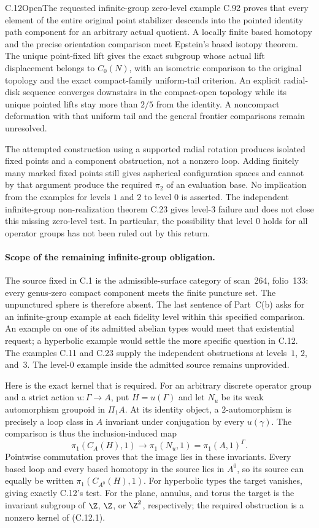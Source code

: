 \begin{claim}{C.12}{Open}{The requested infinite-group zero-level example}
C.92 proves that every element of the entire original point stabilizer descends into the pointed identity path component for an arbitrary actual quotient. A locally finite based homotopy and the precise orientation comparison meet Epstein's based isotopy theorem. The unique point-fixed lift gives the exact subgroup whose actual lift displacement belongs to $C_0(N)$, with an isometric comparison to the original topology and the exact compact-family uniform-tail criterion. An explicit radial-disk sequence converges downstairs in the compact-open topology while its unique pointed lifts stay more than $2/5$ from the identity. A noncompact deformation with that uniform tail and the general frontier comparisons remain unresolved.
\end{claim}
The attempted construction using a supported radial rotation produces
isolated fixed points and a component obstruction, not a nonzero loop.
Adding finitely many marked fixed points still gives aspherical
configuration spaces and cannot by that argument produce the required
$\pi_2$ of an evaluation base. No implication from the examples for
levels $1$ and $2$ to level $0$ is asserted. The independent infinite-group
non-realization theorem C.23 gives level-$3$ failure and does not close
this missing zero-level test. In particular, the possibility that level
$0$ holds for all operator groups has not been ruled out by this return.

\paragraph{Scope of the remaining infinite-group obligation.}
The source fixed in C.1 is the admissible-surface category of scan~264,
folio~133: every genus-zero compact component meets the finite puncture
set. The unpunctured sphere is therefore absent. The last sentence of
Part~C(b) asks for an infinite-group example at each fidelity level
within this specified comparison. An example on one of its admitted
abelian types would meet that existential request; a hyperbolic example
would settle the more specific question in C.12. The examples C.11 and
C.23 supply the independent obstructions at levels~$1$, $2$, and~$3$.
The level-$0$ example inside the admitted source remains unprovided.

Here is the exact kernel that is required. For an arbitrary discrete
operator group and a strict action $u:\Gamma\to A$, put
$H=u(\Gamma)$ and let $N_u$ be its weak automorphism groupoid in
$\Pi_1A$. At its identity object, a $2$-automorphism is precisely a
loop class in $A$ invariant under conjugation by every $u(\gamma)$.
The comparison is thus the inclusion-induced map
\[
 \pi_1(C_A(H),1)\longrightarrow
 \pi_1(N_u,1)=\pi_1(A,1)^\Gamma.                 \tag{C.12.1}
\]
Pointwise commutation proves that the image lies in these invariants.
Every based loop and every based homotopy in the source lies in $A^0$,
so its source can equally be written $\pi_1(C_{A^0}(H),1)$.
For hyperbolic types the target vanishes, giving exactly C.12's test.
For the plane, annulus, and torus the target is the invariant subgroup
of $\Z$, $\Z$, or $\Z^2$, respectively; the required obstruction is a
nonzero kernel of (C.12.1).

